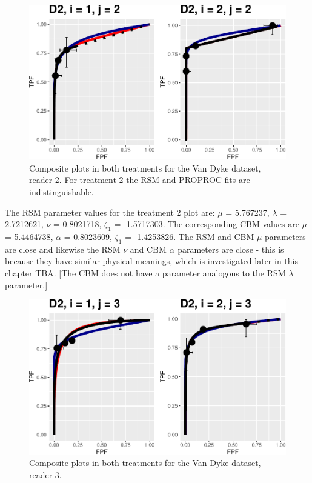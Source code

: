 \documentclass[
]{book}
\begin{document}
\begin{figure}
\centering
\includegraphics{12-rsm-3-fits_files/figure-latex/rsm-3-fits-plots-vd-1-2-1.pdf}
\caption{\label{fig:rsm-3-fits-plots-vd-1-2}Composite plots in both treatments for the Van Dyke dataset, reader 2. For treatment 2 the RSM and PROPROC fits are indistinguishable.}
\end{figure}

The RSM parameter values for the treatment 2 plot are: \(\mu\) = 5.767237, \(\lambda\) = 2.7212621, \(\nu\) = 0.8021718, \(\zeta_1\) = -1.5717303. The corresponding CBM values are \(\mu\) = 5.4464738, \(\alpha\) = 0.8023609, \(\zeta_1\) = -1.4253826. The RSM and CBM \(\mu\) parameters are close and likewise the RSM \(\nu\) and CBM \(\alpha\) parameters are close - this is because they have similar physical meanings, which is investigated later in this chapter TBA. {[}The CBM does not have a parameter analogous to the RSM \(\lambda\) parameter.{]}

\begin{figure}
\centering
\includegraphics{12-rsm-3-fits_files/figure-latex/rsm-3-fits-plots-vd-1-3-1.pdf}
\caption{\label{fig:rsm-3-fits-plots-vd-1-3}Composite plots in both treatments for the Van Dyke dataset, reader 3.}
\end{figure}
\end{document}
